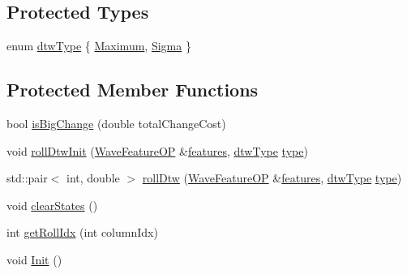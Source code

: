 \subsection*{Protected Types}
\begin{DoxyCompactItemize}
\item 
enum \hyperlink{class_h_m_m_automaton_a971e23dcda492fc9f32b1cddf6822fd2}{dtw\+Type} \{ \hyperlink{class_h_m_m_automaton_a971e23dcda492fc9f32b1cddf6822fd2a2427c9ba053ced14af44df842e351bfa}{Maximum}, 
\hyperlink{class_h_m_m_automaton_a971e23dcda492fc9f32b1cddf6822fd2a749fd94f15dc2e53ed8b3dcdbddd6d88}{Sigma}
 \}
\end{DoxyCompactItemize}
\subsection*{Protected Member Functions}
\begin{DoxyCompactItemize}
\item 
bool \hyperlink{class_h_m_m_automaton_a836856d9c7539cc2b25bc72dc8f96b7d}{is\+Big\+Change} (double total\+Change\+Cost)
\item 
void \hyperlink{class_h_m_m_automaton_a15856e4c7e4a7322d5a2bf15e9cd7440}{roll\+Dtw\+Init} (\hyperlink{class_wave_feature_o_p}{Wave\+Feature\+O\+P} \&\hyperlink{lpc2cep_8m_afcc1d2df0288347ea10603033506e33b}{features}, \hyperlink{class_h_m_m_automaton_a971e23dcda492fc9f32b1cddf6822fd2}{dtw\+Type} \hyperlink{readhtk_8m_ac7798f4aec24aa6076b2b222bd91d4fd}{type})
\item 
std\+::pair$<$ int, double $>$ \hyperlink{class_h_m_m_automaton_a6fb93aa0899b5725eb435708e704df0f}{roll\+Dtw} (\hyperlink{class_wave_feature_o_p}{Wave\+Feature\+O\+P} \&\hyperlink{lpc2cep_8m_afcc1d2df0288347ea10603033506e33b}{features}, \hyperlink{class_h_m_m_automaton_a971e23dcda492fc9f32b1cddf6822fd2}{dtw\+Type} \hyperlink{readhtk_8m_ac7798f4aec24aa6076b2b222bd91d4fd}{type})
\item 
void \hyperlink{class_h_m_m_automaton_a06f4a989be46476c329be70ac78de820}{clear\+States} ()
\item 
int \hyperlink{class_h_m_m_automaton_a500df5c237ddb079ffe4e36a0a55fbcd}{get\+Roll\+Idx} (int column\+Idx)
\item 
void \hyperlink{class_h_m_m_automaton_a48b81c61396a1d2e84827c5a35c9927b}{Init} ()
\end{DoxyCompactItemize}
